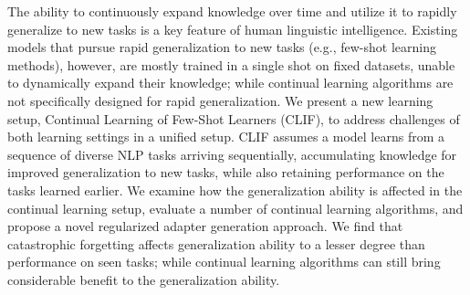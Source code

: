 The ability to continuously expand knowledge over time and utilize it to rapidly generalize to new tasks is a key feature of human linguistic intelligence. Existing models that pursue rapid generalization to new tasks (e.g., few-shot learning methods), however, are mostly trained in a single shot on fixed datasets, unable to dynamically expand their knowledge; while continual learning algorithms are not specifically designed for rapid generalization. We present a new learning setup, Continual Learning of Few-Shot Learners (CLIF), to address challenges of both learning settings in a unified setup. CLIF assumes a model learns from a sequence of diverse NLP tasks arriving sequentially, accumulating knowledge for improved generalization to new tasks, while also retaining performance on the tasks learned earlier. We examine how the generalization ability is affected in the continual learning setup, evaluate a number of continual learning algorithms, and propose a novel regularized adapter generation approach. We find that catastrophic forgetting affects generalization ability to a lesser degree than performance on seen tasks; while continual learning algorithms can still bring considerable benefit to the generalization ability.
